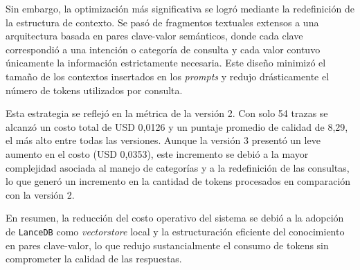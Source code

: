 Sin embargo, la optimización más significativa se logró mediante la redefinición de la estructura de contexto. Se pasó de fragmentos textuales extensos a una arquitectura basada en pares clave-valor semánticos, donde cada clave correspondió a una intención o categoría de consulta y cada valor contuvo únicamente la información estrictamente necesaria. Este diseño minimizó el tamaño de los contextos insertados en los \textit{prompts} y redujo drásticamente el número de tokens utilizados por consulta.

Esta estrategia se reflejó en la métrica de la versión 2. Con solo 54 trazas se alcanzó un costo total de USD 0,0126 y un puntaje promedio de calidad de 8,29, el más alto entre todas las versiones. Aunque la versión 3 presentó un leve aumento en el costo (USD 0,0353), este incremento se debió a la mayor complejidad asociada al manejo de categorías y a la redefinición de las consultas, lo que generó un incremento en la cantidad de tokens procesados en comparación con la versión 2.

En resumen, la reducción del costo operativo del sistema se debió a la adopción de \texttt{LanceDB} como \textit{vectorstore} local y la estructuración eficiente del conocimiento en pares clave-valor, lo que redujo sustancialmente el consumo de tokens sin comprometer la calidad de las respuestas.


